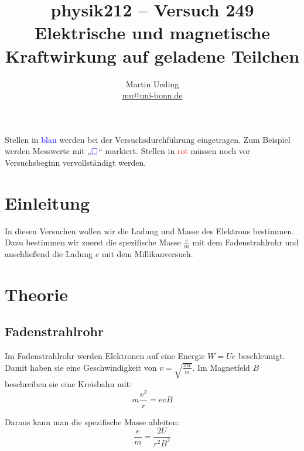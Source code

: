\documentclass[11pt]{article}
\title{physik212 -- Versuch 249 \\ Elektrische und magnetische Kraftwirkung auf geladene Teilchen}
\author{Martin Ueding \\ \href{mailto:mu@uni-bonn.de}{mu@uni-bonn.de}}
\newcommand{\messwert}{\textcolor{blue}{\square}}
\begin{document}
\maketitle

\tableofcontents

\vfill

Stellen in \textcolor{blue}{blau} werden bei der Versuchsdurchführung
eingetragen. Zum Beispiel werden Messwerte mit „$\messwert$“ markiert. Stellen
in \textcolor{red}{rot} müssen noch vor Versuchsbeginn vervollständigt werden.

\newpage


\section{Einleitung}

In diesen Versuchen wollen wir die Ladung und Masse des Elektrons bestimmen.
Dazu bestimmen wir zuerst die spezifische Masse $\frac em$ mit dem
Fadenstrahlrohr und anschließend die Ladung $e$ mit dem Millikanversuch.


\section{Theorie}

\subsection{Fadenstrahlrohr}

Im Fadenstrahlrohr werden Elektronen auf eine Energie $W = Ue$ beschleunigt.
Damit haben sie eine Geschwindigkeit von $v = \sqrt{\frac{2W}{m}}$. Im
Magnetfeld $B$ beschreiben sie eine Kreisbahn mit:
\[ m \frac{v^2}r = e v B \]

Daraus kann man die spezifische Masse ableiten:
\begin{equation}
	\label{eq:spezifische-Masse}
	\frac em = \frac{2U}{r^2 B^2}
\end{equation}
\end{document}
